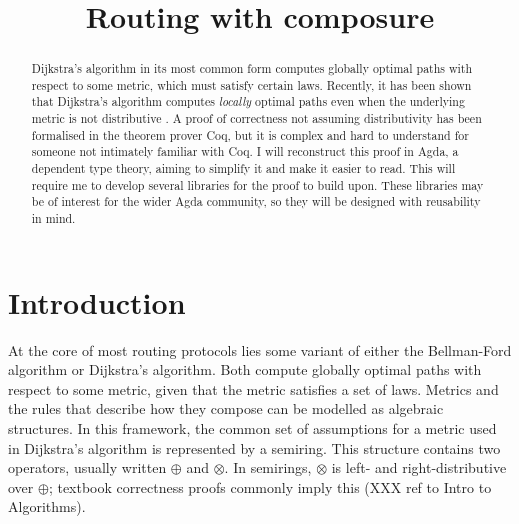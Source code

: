 \documentclass[a4paper]{scrartcl}
\title{\phantomsection%
  Routing with composure%
  \label{generalised-big-operators-in-agda}}
\author{}
\date{}
\begin{document}
\maketitle

% 
% 
% 


\begin{abstract}
Dijkstra's algorithm in its most common form computes globally optimal paths with respect to some metric, which must satisfy certain laws. Recently, it has been shown that Dijkstra's algorithm computes \emph{locally} optimal paths even when the underlying metric is not distributive \autocite{sobrinho_routing_2010}. A proof of correctness not assuming distributivity has been formalised in the theorem prover Coq, but it is complex and hard to understand for someone not intimately familiar with Coq. I will reconstruct this proof in Agda, a dependent type theory, aiming to simplify it and make it easier to read. This will require me to develop several libraries for the proof to build upon. These libraries may be of interest for the wider Agda community, so they will be designed with reusability in mind.
\end{abstract}

\section{Introduction%
  \label{introduction}%
}

At the core of most routing protocols lies some variant of either the Bellman-Ford algorithm or Dijkstra's algorithm. Both compute globally optimal paths with respect to some metric, given that the metric satisfies a set of laws. Metrics and the rules that describe how they compose can be modelled as algebraic structures. In this framework, the common set of assumptions for a metric used in Dijkstra's algorithm is represented by a semiring. This structure contains two operators, usually written \(\oplus\) and \(\otimes\). In semirings, \(\otimes\) is left- and right-distributive over \(\oplus\); textbook correctness proofs commonly imply this (XXX ref to Intro to Algorithms).
\end{document}
